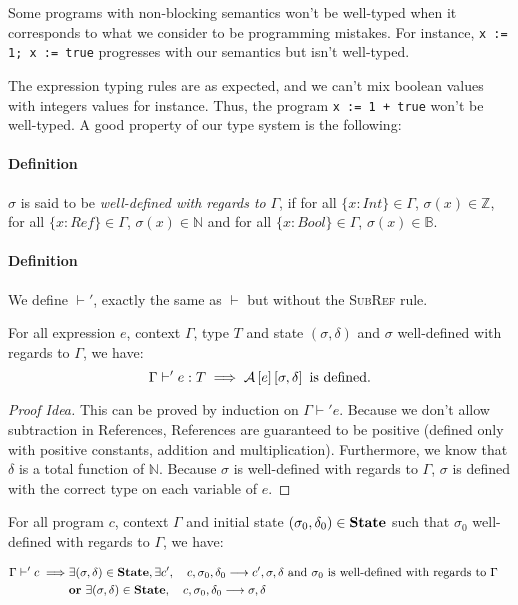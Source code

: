 Some programs with non-blocking semantics won't be well-typed when it corresponds to what we consider to be programming mistakes. For instance, \texttt{x := 1; x := true} progresses with our semantics but isn't well-typed.

The expression typing rules are as expected, and we can't mix boolean values with integers values for instance. Thus, the program \texttt{x := 1 + true} won't be well-typed. A good property of our type system is the following:\\

\paragraph{Definition} $\sigma$ is said to be \textit{well-defined with regards to} $\Gamma$, if for all $\{x:Int\}\in\Gamma$, $\sigma(x)\in\mathbb{Z}$, for all $\{x:Ref\}\in\Gamma$, $\sigma(x)\in\mathbb{N}$ and for all $\{x:Bool\}\in\Gamma$, $\sigma(x)\in\mathbb{B}$.

\paragraph{Definition} We define $\vdash'$, exactly the same as $\vdash$ but without the \textsc{SubRef} rule.

\begin{thm}
For all expression $e$, context $\Gamma$, type $T$ and state $(\sigma, \delta)$ and $\sigma$ well-defined with regards to $\Gamma$, we have:
\[
\Gamma\vdash' e : T\implies \mathcal{A}\left[e\right]\left[\sigma,\delta\right]\text{ is defined}.
\]
\end{thm}

\begin{proof}[Proof Idea]
This can be proved by induction on $\Gamma\vdash' e$. Because we don't allow subtraction in References, References are guaranteed to be positive (defined only with positive constants, addition and multiplication). Furthermore, we know that $\delta$ is a total function of $\mathbb{N}$. Because $\sigma$ is well-defined with regards to $\Gamma$, $\sigma$ is defined with the correct type on each variable of $e$.
\end{proof}


\begin{thm}[Progress]
For all program $c$, context $\Gamma$ and initial state $(\sigma_0, \delta_0) \in \mathbf{State}{}$ such that $\sigma_0$ well-defined with regards to $\Gamma$, we have:

\begin{align*}
  \Gamma \vdash' c \implies & \exists (\sigma, \delta) \in \mathbf{State}{}, \exists c', \quad c, \sigma_0, \delta_0 \longrightarrow c',\sigma, \delta \text{ and $\sigma_0$ is well-defined with regards to $\Gamma$\quad} \\
  & \textbf{or}~ \exists (\sigma, \delta) \in \mathbf{State}{}, \quad c, \sigma_0, \delta_0 \longrightarrow \sigma, \delta
\end{align*}

\end{thm}

